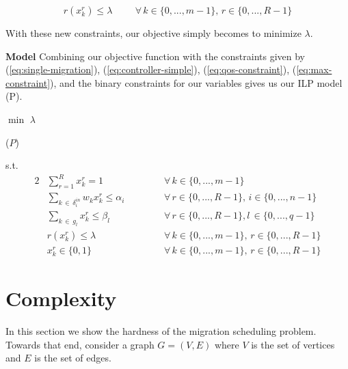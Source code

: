 \documentclass[letterpaper,12pt,titlepage,oneside,final]{article}
\let\oldcenter\center
\let\oldendcenter\endcenter
\renewenvironment{center}{\setlength\topsep{0pt}\oldcenter}{\oldendcenter}
\begin{document}
\begin{equation}\label{eq:max-constraint}
    r(x^{r}_{k}) \leq \lambda \hspace{1cm} \forall \, k \in \{0, ..., m-1\}, \, r \in \{0, ..., R - 1\}
\end{equation}

With these new constraints, our objective simply becomes to minimize $\lambda$.\newline

\noindent\textbf{Model}\newline
\noindent Combining our objective function with the constraints given by (\ref{eq:single-migration}), (\ref{eq:controller-simple}), (\ref{eq:qos-constraint}), (\ref{eq:max-constraint}), and the binary constraints for our variables gives us our ILP model (P).\newline
\newpage

\begin{minipage}{0.8\textwidth}
\begin{center}
    $\min$ $\lambda$
\end{center}
\end{minipage}
\begin{minipage}{0.15\textwidth}
\begin{center}
    ($P$)
\end{center}
\end{minipage}
s.t.
\begin{center}
    \begin{alignat*}{2}
        &\sum_{r=1}^{R} x^{r}_{k} = 1 \hspace{2cm} &&\forall \, k \in \{0, ..., m-1\} \\
        &\sum_{k \, \in \, \delta^{in}_{i}} w_{k}x^{r}_{k} \leq \alpha_{i} &&\forall \, r \in \{0, ..., R-1\}, \, i \in \{0, ..., n-1\}\\
        &\sum_{k \, \in \, g_{l}} x^{r}_{k} \leq \beta_{l} &&\forall \, r \in \{0, ..., R-1\}, l\,  \in \{0, ..., q-1\}\\
        &r(x^{r}_{k}) \leq \lambda &&\forall \, k \in \{0, ..., m - 1\}, \, r \in \{0, ..., R - 1\}\\
        &x^{r}_{k} \in \{0, 1\} &&\forall \, k \in \{0, ..., m - 1\}, \, r \in \{0, ..., R - 1\}
    \end{alignat*}
\end{center}

\section{Complexity}
In this section we show the hardness of the migration scheduling problem. Towards that end, consider a graph $G=(V, E)$ where $V$ is the set of vertices and $E$ is the set of edges. 
\end{document}

